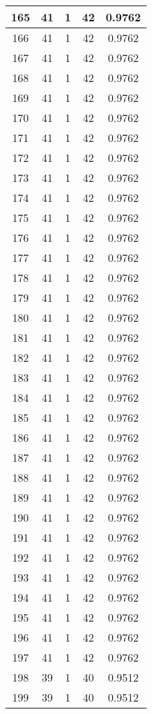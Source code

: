 \documentclass[letterpaper, 12pt]{article}
\begin{document}
\begin{longtable}{|c|c|c|c|c|}
\hline
165 & 41 & 1 & 42 & 0.9762 \\
\hline
166 & 41 & 1 & 42 & 0.9762 \\
\hline
167 & 41 & 1 & 42 & 0.9762 \\
\hline
168 & 41 & 1 & 42 & 0.9762 \\
\hline
169 & 41 & 1 & 42 & 0.9762 \\
\hline
170 & 41 & 1 & 42 & 0.9762 \\
\hline
171 & 41 & 1 & 42 & 0.9762 \\
\hline
172 & 41 & 1 & 42 & 0.9762 \\
\hline
173 & 41 & 1 & 42 & 0.9762 \\
\hline
174 & 41 & 1 & 42 & 0.9762 \\
\hline
175 & 41 & 1 & 42 & 0.9762 \\
\hline
176 & 41 & 1 & 42 & 0.9762 \\
\hline
177 & 41 & 1 & 42 & 0.9762 \\
\hline
178 & 41 & 1 & 42 & 0.9762 \\
\hline
179 & 41 & 1 & 42 & 0.9762 \\
\hline
180 & 41 & 1 & 42 & 0.9762 \\
\hline
181 & 41 & 1 & 42 & 0.9762 \\
\hline
182 & 41 & 1 & 42 & 0.9762 \\
\hline
183 & 41 & 1 & 42 & 0.9762 \\
\hline
184 & 41 & 1 & 42 & 0.9762 \\
\hline
185 & 41 & 1 & 42 & 0.9762 \\
\hline
186 & 41 & 1 & 42 & 0.9762 \\
\hline
187 & 41 & 1 & 42 & 0.9762 \\
\hline
188 & 41 & 1 & 42 & 0.9762 \\
\hline
189 & 41 & 1 & 42 & 0.9762 \\
\hline
190 & 41 & 1 & 42 & 0.9762 \\
\hline
191 & 41 & 1 & 42 & 0.9762 \\
\hline
192 & 41 & 1 & 42 & 0.9762 \\
\hline
193 & 41 & 1 & 42 & 0.9762 \\
\hline
194 & 41 & 1 & 42 & 0.9762 \\
\hline
195 & 41 & 1 & 42 & 0.9762 \\
\hline
196 & 41 & 1 & 42 & 0.9762 \\
\hline
197 & 41 & 1 & 42 & 0.9762 \\
\hline
198 & 39 & 1 & 40 & 0.9512 \\
\hline
199 & 39 & 1 & 40 & 0.9512 \\
\hline
\end{longtable}
\end{document}
